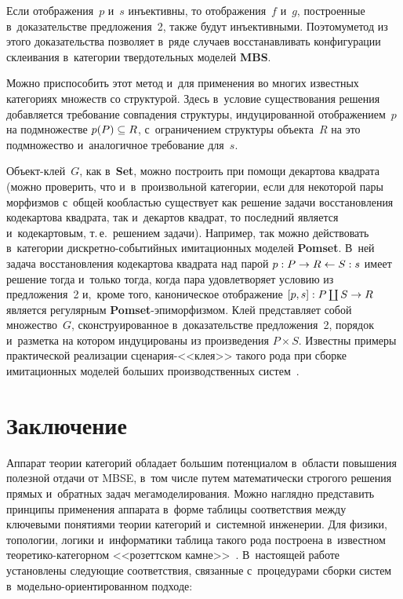 \begin{multicols}{2}
{}
   
   
   
   Если отображения~$p$ и~$s$ инъективны, то отоб\-ра\-же\-ния~$f$ и~$g$, 
построенные в~доказательстве предложения~2, также будут инъективными. 
Поэтому\linebreak метод из этого доказательства позволяет в~ряде случаев 
восстанавливать конфигурации склеивания в~категории твердотельных моделей 
\textbf{MBS}. 

Можно приспособить этот метод и~для применения во многих известных 
категориях множеств со структурой. Здесь в~условие существования решения 
добавляется требование совпадения структуры, индуцированной 
отображением~$p$ на подмножестве $p(P) \hm\subseteq R$, с~ограничением 
структуры объекта~$R$ на это подмножество и~аналогичное требование 
для~$s$. 
{

}

Объ\-ект-клей~$G$, как в~\textbf{Set}, можно построить при помощи декартова 
квадрата (можно проверить, что и~в~произвольной категории, если для 
некоторой пары морфизмов с~общей кообластью существует как решение 
задачи восстановления кодекартова квадрата, так и~декартов квадрат, то 
последний является и~кодекартовым, т.\,е.\ решением задачи). Например, так 
можно действовать в~категории дискретно-событийных имитационных моделей 
\textbf{Pomset}. В~ней задача восстановления кодекартова квадрата над парой $p : P 
\hm\to R \hm\leftarrow S : s$ имеет решение тогда и~только тогда, когда пара 
удовлетворяет условию из предложения~2 и,~кроме того, каноническое 
отображение $[p, s] : P \coprod S \hm\to R$ является регулярным  
\textbf{Pomset}-эпи\-мор\-физ\-мом. Клей представляет собой множество~$G$, 
сконструированное в~доказательстве предложения~2, порядок и~разметка на 
котором индуцированы из произведения $P\times  S$. Известны примеры 
практической реализации сце\-на\-рия-<<клея>> такого рода при сборке 
имитационных моделей больших производственных сис\-тем~\cite{17-kov}.

\section{Заключение}

   Аппарат теории категорий обладает большим потенциалом в~области 
повышения полезной отдачи от MBSE, в~том числе путем математически 
строгого решения прямых и~обратных задач мегамоделирования. Можно 
наглядно представить принципы применения аппарата в~форме таб\-ли\-цы 
соответствия между ключевыми понятиями теории категорий и~сис\-тем\-ной 
инженерии. Для физики, топологии, логики и~информатики таблица такого рода 
построена в~известном тео\-ре\-ти\-ко-ка\-те\-гор\-ном <<розеттском 
камне>>~\cite{18-kov}. В~настоящей работе установлены следующие 
соответствия, связанные с~процедурами сборки сис\-тем  
в~мо\-дель\-но-ори\-ен\-ти\-ро\-ван\-ном подходе:


\end{multicols}
